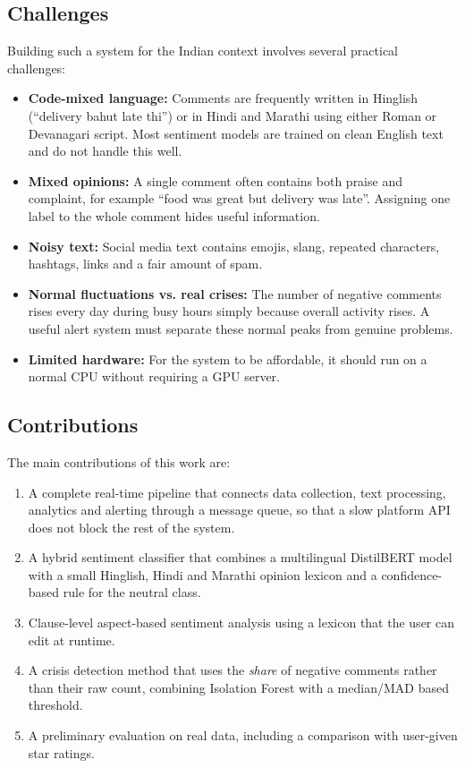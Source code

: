 \documentclass[conference]{IEEEtran}
\begin{document}
\subsection{Challenges}
Building such a system for the Indian context involves several practical challenges:
\begin{itemize}
\item \textbf{Code-mixed language:} Comments are frequently written in Hinglish (``delivery bahut
late thi'') or in Hindi and Marathi using either Roman or Devanagari script. Most sentiment models
are trained on clean English text and do not handle this well.
\item \textbf{Mixed opinions:} A single comment often contains both praise and complaint, for
example ``food was great but delivery was late''. Assigning one label to the whole comment hides
useful information.
\item \textbf{Noisy text:} Social media text contains emojis, slang, repeated characters, hashtags,
links and a fair amount of spam.
\item \textbf{Normal fluctuations vs. real crises:} The number of negative comments rises every day
during busy hours simply because overall activity rises. A useful alert system must separate these
normal peaks from genuine problems.
\item \textbf{Limited hardware:} For the system to be affordable, it should run on a normal CPU
without requiring a GPU server.
\end{itemize}

\subsection{Contributions}
The main contributions of this work are:
\begin{enumerate}
\item A complete real-time pipeline that connects data collection, text processing, analytics and
alerting through a message queue, so that a slow platform API does not block the rest of the system.
\item A hybrid sentiment classifier that combines a multilingual DistilBERT model with a small
Hinglish, Hindi and Marathi opinion lexicon and a confidence-based rule for the neutral class.
\item Clause-level aspect-based sentiment analysis using a lexicon that the user can edit at runtime.
\item A crisis detection method that uses the \textit{share} of negative comments rather than their
raw count, combining Isolation Forest with a median/MAD based threshold.
\item A preliminary evaluation on real data, including a comparison with user-given star ratings.
\end{enumerate}
\end{document}

